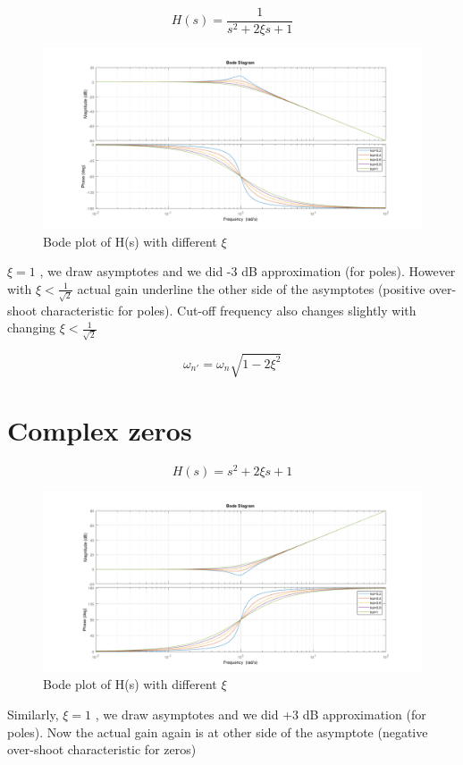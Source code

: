 \documentclass[11pt]{article}
\begin{document}
\[H(s)=\frac{1}{s^2+2\xi s + 1
}\]

\begin{figure}[H]
  \includegraphics[scale=0.5, center]{complex-poles}
  \caption{Bode plot of H(s) with different $\xi$}
  \label{fig:zero}
\end{figure}

$\xi=1$ , we draw asymptotes and we did -3 dB approximation (for poles). However with $\xi<\frac{1}{\sqrt{2}}$ actual gain underline the other side of the asymptotes (positive over-shoot characteristic for poles). Cut-off frequency also changes slightly with changing $\xi<\frac{1}{\sqrt{2}}$

\[\omega_{n'}=\omega_{n}\sqrt{1-2\xi^2}\]

\section*{Complex zeros}

\[H(s)=s^2+2\xi s + 1\]

\begin{figure}[H]
  \includegraphics[scale=0.5, center]{complex-zeros}
  \caption{Bode plot of H(s) with different $\xi$}
  \label{fig:zero}
\end{figure}
Similarly, $\xi=1$ , we draw asymptotes and we did +3 dB approximation (for poles). Now the actual gain again is at other side of the asymptote (negative over-shoot characteristic for zeros)
\end{document}
